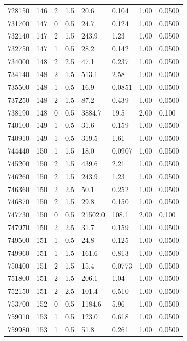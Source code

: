 \documentclass[preview]{standalone}
\begin{document}
{{{{{{{{{{{\begin{tabular}{L{1.2cm}C{1.2cm} C{0.3cm}C{0.5cm} C{1.4cm}C{1.4cm} C{1.4cm}C{1.4cm}}
  728150  &   146  & 2     & 1.5 &  20.6  & 0.104  & 1.00 &  0.0500   \\ 
  731700  &   147  & 0     & 0.5 &  24.7  & 0.124  & 1.00 &  0.0500   \\ 
  732140  &   147  & 2     & 1.5 &  243.9  & 1.23  & 1.00 &  0.0500   \\ 
  732750  &   147  & 1     & 0.5 &  28.2  & 0.142  & 1.00 &  0.0500   \\ 
  734000  &   148  & 2     & 2.5 &  47.1  & 0.237  & 1.00 &  0.0500   \\ 
  734140  &   148  & 2     & 1.5 &  513.1  & 2.58  & 1.00 &  0.0500   \\ 
  735500  &   148  & 1     & 0.5 &  16.9  & 0.0851  & 1.00 &  0.0500   \\ 
  737250  &   148  & 2     & 1.5 &  87.2  & 0.439  & 1.00 &  0.0500   \\ 
  738190  &   148  & 0     & 0.5 &  3884.7  & 19.5  & 2.00 &  0.100   \\ 
  740100  &   149  & 1     & 0.5 &  31.6  & 0.159  & 1.00 &  0.0500   \\ 
  740910  &   149  & 1     & 0.5 &  319.5  & 1.61  & 1.00 &  0.0500   \\ 
  744440  &   150  & 1     & 1.5 &  18.0  & 0.0907  & 1.00 &  0.0500   \\ 
  745200  &   150  & 2     & 1.5 &  439.6  & 2.21  & 1.00 &  0.0500   \\ 
  746260  &   150  & 2     & 1.5 &  243.9  & 1.23  & 1.00 &  0.0500   \\ 
  746360  &   150  & 2     & 2.5 &  50.1  & 0.252  & 1.00 &  0.0500   \\ 
  746870  &   150  & 2     & 1.5 &  29.8  & 0.150  & 1.00 &  0.0500   \\ 
  747730  &   150  & 0     & 0.5 &  21502.0  & 108.1  & 2.00 &  0.100   \\ 
  747970  &   150  & 2     & 2.5 &  31.7  & 0.159  & 1.00 &  0.0500   \\ 
  749500  &   151  & 1     & 0.5 &  24.8  & 0.125  & 1.00 &  0.0500   \\ 
  749960  &   151  & 1     & 1.5 &  161.6  & 0.813  & 1.00 &  0.0500   \\ 
  750400  &   151  & 2     & 1.5 &  15.4  & 0.0773  & 1.00 &  0.0500   \\ 
  751800  &   151  & 2     & 1.5 &  206.1  & 1.04  & 1.00 &  0.0500   \\ 
  752150  &   151  & 2     & 2.5 &  101.4  & 0.510  & 1.00 &  0.0500   \\ 
  753700  &   152  & 0     & 0.5 &  1184.6  & 5.96  & 1.00 &  0.0500   \\ 
  759010  &   153  & 1     & 0.5 &  123.0  & 0.618  & 1.00 &  0.0500   \\ 
  759980  &   153  & 1     & 0.5 &  51.8  & 0.261  & 1.00 &  0.0500   \\ 
\hline 
\end{tabular} 

}}}}}}}}}}}
\end{document}
